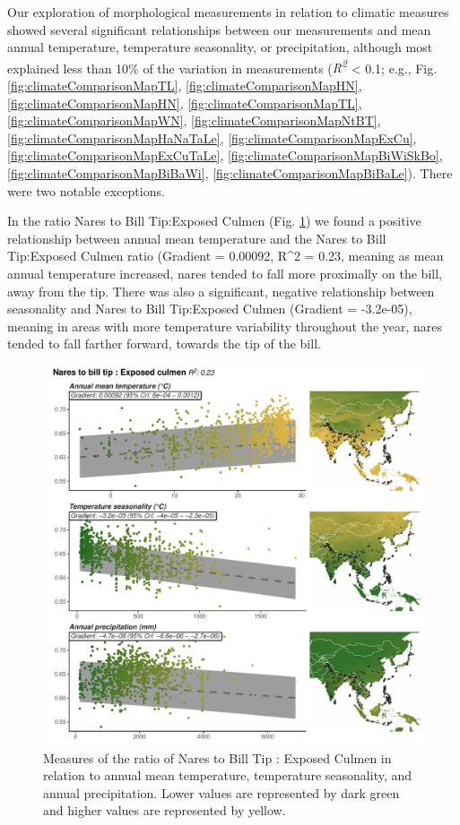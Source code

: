 \documentclass[10pt,a4paper]{article}
\begin{document}
Our exploration of morphological measurements in relation to climatic measures showed several significant relationships between our measurements and mean annual temperature, temperature seasonality, or precipitation, although most explained less than 10\% of the variation in measurements (\emph{R\textsuperscript{2}} \textless{} 0.1; e.g., Fig. \ref{fig:climateComparisonMapTL}, \ref{fig:climateComparisonMapHN}, \ref{fig:climateComparisonMapHN}, \ref{fig:climateComparisonMapTL}, \ref{fig:climateComparisonMapWN}, \ref{fig:climateComparisonMapNtBT}, \ref{fig:climateComparisonMapHaNaTaLe}, \ref{fig:climateComparisonMapExCu}, \ref{fig:climateComparisonMapExCuTaLe}, \ref{fig:climateComparisonMapBiWiSkBo}, \ref{fig:climateComparisonMapBiBaWi}, \ref{fig:climateComparisonMapBiBaLe}).
There were two notable exceptions.

In the ratio Nares to Bill Tip:Exposed Culmen (Fig. \ref{fig:climateComparisonMapNtBTExCu}) we found a positive relationship between annual mean temperature and the Nares to Bill Tip:Exposed Culmen ratio (Gradient = 0.00092, R\^{}2 = 0.23, meaning as mean annual temperature increased, nares tended to fall more proximally on the bill, away from the tip.
There was also a significant, negative relationship between seasonality and Nares to Bill Tip:Exposed Culmen (Gradient = -3.2e-05), meaning in areas with more temperature variability throughout the year, nares tended to fall farther forward, towards the tip of the bill.

\begin{figure}
\includegraphics[width=0.9\linewidth]{../Figures/climMap_NtBT.ExCu} \caption{Measures of the ratio of Nares to Bill Tip : Exposed Culmen in relation to annual mean temperature, temperature seasonality, and annual precipitation. Lower values are represented by dark green and higher values are represented by yellow.}\label{fig:climateComparisonMapNtBTExCu}
\end{figure}
\end{document}
